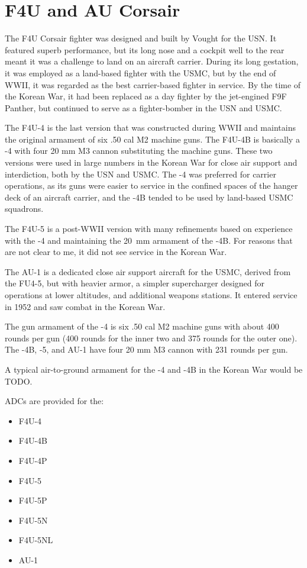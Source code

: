 \section*{F4U and AU Corsair}

The F4U Corsair fighter was designed and built by Vought for the USN. It featured superb performance, but its long nose and a cockpit well to the rear meant it was a challenge to land on an aircraft carrier. During its long gestation, it was employed as a land-based fighter with the USMC, but by the end of WWII, it was regarded as the best carrier-based fighter in service. By the time of the Korean War, it had been replaced as a day fighter by the jet-engined F9F Panther, but continued to serve as a fighter-bomber in the USN and USMC.

The F4U-4 is the last version that was constructed during WWII and maintains the original armament of six .50 cal M2 machine guns. The F4U-4B is basically a -4 with four 20 mm M3 cannon substituting the machine guns. These two versions were used in large numbers in the Korean War for close air support and interdiction, both by the USN and USMC. The -4 was preferred for carrier operations, as its guns were easier to service in the confined spaces of the hanger deck of an aircraft carrier, and the -4B tended to be used by land-based USMC squadrons.

The F4U-5 is a post-WWII version with many refinements based on experience with the -4 and maintaining the 20~mm armament of the -4B. For reasons that are not clear to me, it did not see service in the Korean War.

The AU-1 is a dedicated close air support aircraft for the USMC, derived from the FU4-5, but with heavier armor, a simpler supercharger designed for operations at lower altitudes, and additional weapons stations. It entered service in 1952 and saw combat in the Korean War.

The gun armament of the -4 is six .50 cal M2 machine guns with about 400 rounds per gun (400 rounds for the inner two and 375 rounds for the outer one). The -4B, -5, and AU-1 have four 20 mm M3 cannon with 231 rounds per gun. 

A typical air-to-ground armament for the -4 and -4B in the Korean War would be TODO. 

ADCs are provided for the:
\begin{itemize}
\item F4U-4
\item F4U-4B
\item F4U-4P
\item F4U-5
\item F4U-5P
\item F4U-5N
\item F4U-5NL
\item AU-1
\end{itemize}

